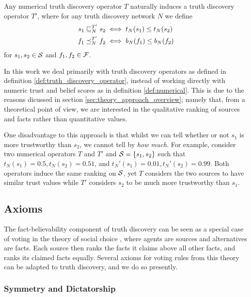 \documentclass[../main.tex]{subfiles}
\begin{document}
\begin{remark}
    Any numerical truth discovery operator $T$ naturally induces a
    truth discovery operator $T'$, where for any truth discovery network $N$
    we define
    \begin{align*}
    s_1 \sle_N^{T'} s_2 & \iff t_N(s_1) \le t_N(s_2) \\
    f_1 \fle_N^{T'} f_2 & \iff b_N(f_1) \le b_N(f_2)
    \end{align*}
    for $s_1, s_2 \in \S$ and $f_1, f_2 \in \F$.
\end{remark}

In this work we deal primarily with truth discovery operators as defined in
definition \ref{def:truth_discovery_operator}, instead of working directly with
numeric trust and belief scores as in definition \ref{def:numerical}. This is
due to the reasons dicussed in section \ref{sec:theory_approach_overview}; namely
that, from a theoretical point of view, we are interested in the qualitative
ranking of sources and facts rather than quantitative values.

One disadvantage to this approach is that whilst we can tell whether or not
$s_1$ is more trustworthy than $s_2$, we cannot tell by \emph{how much}. For
example, consider two numerical operators $T$ and $T'$ and $\S=\{s_1, s_2\}$
such that $t_N(s_1)=0.5, t_N(s_2)=0.51$, and $t_N'(s_1)=0.01, t_N'(s_2)=0.99$.
Both operators induce the same ranking on $\S$, yet $T$ considers the two
sources to have similar trust values while $T'$ considers $s_2$ to be much more
trustworthy than $s_1$.

\subsection{Axioms}
\label{sec:axioms}

The fact-believability component of truth discovery can be seen as a special
case of voting in the theory of social choice \cite{handbook_voting}, where
agents are sources and alternatives are facts. Each source then ranks the facts
it claims above all other facts, and ranks its claimed facts
equally\footnotemark. Several axioms for voting rules from this theory can be
adapted to truth discovery, and we do so presently.



\subsubsection*{Symmetry and Dictatorship}
\end{document}
